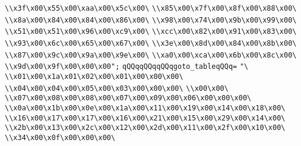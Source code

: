 \verb|\\x3f\x00\x55\x00\xaa\x00\x5c\x00\|\newline
\verb|\\x85\x00\x7f\x00\x8f\x00\x88\x00\|\newline
\verb|\\x8a\x00\x84\x00\x84\x00\x86\x00\|\newline
\verb|\\x98\x00\x74\x00\x9b\x00\x99\x00\|\newline
\verb|\\x51\x00\x51\x00\x96\x00\xc9\x00\|\newline
\verb|\\xcc\x00\x82\x00\x91\x00\x83\x00\|\newline
\verb|\\x93\x00\x6c\x00\x65\x00\x67\x00\|\newline
\verb|\\x3e\x00\x8d\x00\x84\x00\x8b\x00\|\newline
\verb|\\x87\x00\x9c\x00\x9a\x00\x9e\x00\|\newline
\verb|\\xa0\x00\xca\x00\x6b\x00\x8c\x00\|\newline
\verb|\\x9d\x00\x9f\x00\x00\x00";|\newline
\verb|qQQqqQQqqQQqgoto_tableqQQq=|\newline
\verb|"\|\newline
\verb|\\x01\x00\x1a\x01\x02\x00\x01\x00\x00\x00\|\newline
\verb|\\x04\x00\x04\x00\x05\x00\x03\x00\x00\x00\|\newline
\verb|\\x00\x00\|\newline
\verb|\\x07\x00\x08\x00\x08\x00\x07\x00\x09\x00\x06\x00\x00\x00\|\newline
\verb|\\x0a\x00\x1b\x00\x0e\x00\x1a\x00\x11\x00\x19\x00\x14\x00\x18\x00\|\newline
\verb|\\x16\x00\x17\x00\x17\x00\x16\x00\x21\x00\x15\x00\x29\x00\x14\x00\|\newline
\verb|\\x2b\x00\x13\x00\x2c\x00\x12\x00\x2d\x00\x11\x00\x2f\x00\x10\x00\|\newline
\verb|\\x34\x00\x0f\x00\x00\x00\|\newline
